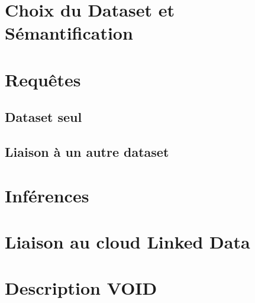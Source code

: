 \chapter{Choix du Dataset et Sémantification}
\chapter{Requêtes}
\section{Dataset seul}
\section{Liaison à un autre dataset}
\chapter{Inférences}
\chapter{Liaison au cloud Linked Data}
\chapter{Description VOID}
